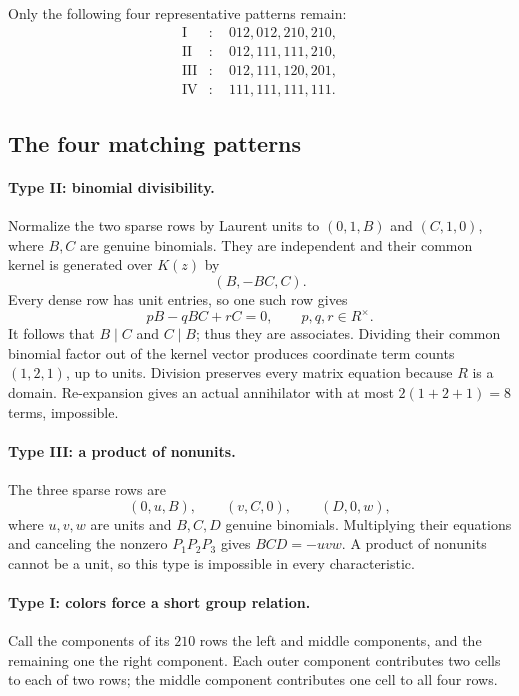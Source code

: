 \documentclass[11pt,a4paper,oneside]{report}
\theoremstyle{definition}
\theoremstyle{remark}
\begin{document}
Only the following four representative patterns remain:
\begin{align*}
 \mathrm{I}&:\quad012,012,210,210,\\
 \mathrm{II}&:\quad012,111,111,210,\\
 \mathrm{III}&:\quad012,111,120,201,\\
 \mathrm{IV}&:\quad111,111,111,111.
\end{align*}

\subsection{The four matching patterns}

\paragraph{Type II: binomial divisibility.}
Normalize the two sparse rows by Laurent units to
\((0,1,B)\) and \((C,1,0)\), where \(B,C\) are genuine binomials.
They are independent and their common kernel is generated over \(K(z)\)
by
\[
 (B,-BC,C).
\]
Every dense row has unit entries, so one such row gives
\[
 pB-qBC+rC=0,\qquad p,q,r\in R^\times.
\]
It follows that \(B\mid C\) and \(C\mid B\); thus they are associates.
Dividing their common binomial factor out of the kernel vector produces
coordinate term counts \((1,2,1)\), up to units. Division preserves
every matrix equation because \(R\) is a domain. Re-expansion gives
an actual annihilator with at most \(2(1+2+1)=8\) terms, impossible.

\paragraph{Type III: a product of nonunits.}
The three sparse rows are
\[
 (0,u,B),\qquad (v,C,0),\qquad (D,0,w),
\]
where \(u,v,w\) are units and \(B,C,D\) genuine binomials.
Multiplying their equations and canceling the nonzero
\(P_1P_2P_3\) gives \(BCD=-uvw\). A product of nonunits cannot be a
unit, so this type is impossible in every characteristic.

\paragraph{Type I: colors force a short group relation.}
Call the components of its \(210\) rows the left and middle components,
and the remaining one the right component. Each outer component
contributes two cells to each of two rows; the middle component
contributes one cell to all four rows.
\end{document}
